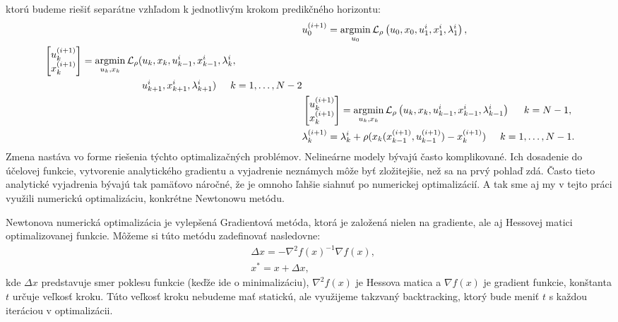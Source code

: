ktorú budeme riešiť separátne vzhľadom k jednotlivým krokom predikčného horizontu:
\begin{subequations}
\begin{align}
	&u_{0}^{(i+1)} = \argmin_{u_{0}} \mathcal{L}_{\rho} \left(u_0,x_{0},u_1^{i},x_{1}^{i},\lambda_{1}^{i}\right),\\
	\begin{split}
		&\begin{bmatrix}
		u_{k}^{(i+1)} \\
		x_{k}^{(i+1)}
		\end{bmatrix} = 
		\argmin_{u_{k},x_{k}} \mathcal{L}_{\rho} (u_{k},x_{k},u_{k-1}^{i},x_{k-1}^{i},\lambda_{k}^{i},\\
		&\hspace{3.5cm}u_{k+1}^{i},x_{k+1}^{i},\lambda_{k+1}^{i})\hspace{0.5cm} k=1,\dots,N-2
	\end{split}\\
	&\begin{bmatrix}
		u_{k}^{(i+1)} \\
		x_{k}^{(i+1)}
	\end{bmatrix} = \argmin_{u_{k},x_{k}} \mathcal{L}_{\rho} \left(u_{k},x_{k},u_{k-1}^{i},x_{k-1}^{i},\lambda_{k-1}^{i}\right) \hspace{0.5cm} k=N-1,\\
	&\lambda_{k}^{(i+1)} = \lambda_{k}^{i} + \rho( x_{k}(x_{k-1}^{(i+1)},u_{k-1}^{(i+1)}) - x_{k}^{(i+1)}) \hspace{0.5cm} k=1,\dots,N-1.
\end{align}
\end{subequations}
Zmena nastáva vo forme riešenia týchto optimalizačných problémov. 
Nelineárne modely bývajú často komplikované. Ich dosadenie do účelovej funkcie, vytvorenie analytického gradientu a vyjadrenie neznámych môže byť zložitejšie, než sa na prvý pohlaď zdá. Často tieto analytické vyjadrenia bývajú tak pamäťovo náročné, že je omnoho ľahšie siahnuť po numerickej optimalizácií. A tak sme aj my v tejto práci využili numerickú optimalizáciu, konkrétne Newtonowu metódu. 

\label{opt:Newton}
Newtonova numerická optimalizácia je vylepšená Gradientová metóda, ktorá je založená nielen na gradiente, ale aj Hessovej matici optimalizovanej funkcie. Môžeme si túto metódu zadefinovať nasledovne:
\begin{subequations}
\begin{align}
&\Delta x = -\nabla^{2}f(x)^{-1} \nabla f(x), \\
& x^{*} = x + \Delta x,
\end{align}
\end{subequations}
kde $\Delta x$ predstavuje smer poklesu funkcie (keďže ide o minimalizáciu), $\nabla^{2}f(x)$ je Hessova matica a $\nabla f(x)$ je gradient funkcie, konštanta $t$ určuje veľkosť kroku. 
Túto veľkosť kroku nebudeme mať statickú, ale využijeme takzvaný backtracking, ktorý bude meniť $t$ s každou iteráciou v optimalizácii.

